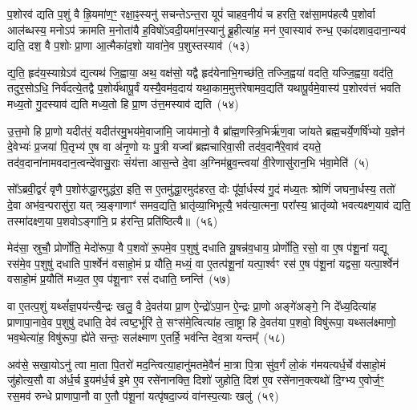 प॒शोरव॑ द्यति प॒शुं वै ह्रि॒यमा॑ण॒ꣳ॒ रक्षा॒ꣴ॒स्यनु॑ सचन्ते\-ऽन्त॒रा यूपं॑ चाहव॒नीयं॑ च हरति॒ रक्ष॑सा॒मप॑हत्यै प॒शोर्वा आल॑ब्धस्य॒ मनो\-ऽप॑ क्रामति म॒नोता॑यै ह॒विषो॑\-ऽवदी॒यमा॑न॒स्यानु॑ ब्रू॒हीत्या॑ह॒ मन॑ ए॒वास्याव॑ रुन्ध॒ एका॑\-दशाव॒दाना॒न्यव॑ द्यति॒ दश॒ वै प॒शोः प्रा॒णा आ॒त्मैका॑द॒शो यावा॑ने॒व प॒शुस्तस्याव॑~(५३)

द्य॒ति॒ हृद॑य॒स्याग्रे\-ऽव॑ द्य॒त्यथ॑ जि॒ह्वाया॒ अथ॒ वक्ष॑सो॒ यद्वै हृद॑येनाभि॒गच्छ॑ति॒ तज्जि॒ह्वया॑ वदति॒ यज्जि॒ह्वया॒ वद॑ति॒ तदुर॒सो\-ऽधि॒ निर्व॑दत्ये॒तद्वै प॒शोर्य॑थापू॒र्वं यस्यै॒वम॑व॒दाय॑ यथा॒काम॒मुत्त॑रेषामव॒द्यति॑ यथापू॒र्वमे॒वास्य॑ प॒शोरव॑त्तं भवति मध्य॒तो गु॒दस्याव॑ द्यति मध्य॒तो हि प्रा॒ण उ॑त्त॒मस्याव॑ द्यति~(५४)

उ॒त्त॒मो हि प्रा॒णो यदीत॑रं॒ यदीत॑रमु॒भय॑मे॒वाजा॑मि॒ जाय॑मानो॒ वै ब्रा᳚ह्म॒णस्त्रि॒भिर्\mbox{}ऋ॑ण॒वा जा॑यते ब्रह्म॒चर्ये॒णर्\mbox{}षि॑भ्यो य॒ज्ञेन॑ दे॒वेभ्यः॑ प्र॒जया॑ पि॒तृभ्य॑ ए॒ष वा अ॑नृ॒णो यः पु॒त्री यज्वा᳚ ब्रह्मचारिवा॒सी तद॑व॒दानै॑रे॒वाव॑ दयते॒ तद॑व॒दाना॑नामवदान॒त्वन्दे॑वासु॒राः संय॑त्ता आस॒न्ते दे॒वा अ॒ग्निम॑ब्रुव॒न्त्वया॑ वी॒रेणासु॑रान॒भि भ॑वा॒मेति॑~(५)

सो᳚\-ऽब्रवी॒द्वरं॑ वृणै प॒शोरु॑द्धा॒रमुद्ध॑रा॒ इति॒ स ए॒तमु॑द्धा॒रमुद॑हरत॒ दोः पू᳚र्वा॒र्धस्य॑ गु॒दं म॑ध्य॒तः श्रोणिं॑ जघना॒र्धस्य॒ ततो॑ दे॒वा अभ॑व॒न्परासु॑रा॒ यत् त्र्य॒ङ्गाणाꣳ॑ समव॒द्यति॒ भ्रातृ॑व्या॒भिभूत्यै॒ भव॑त्या॒त्मना॒ परा᳚स्य॒ भ्रातृ॑व्यो भवत्यक्ष्ण॒याव॑ द्यति॒ तस्मा॑दक्ष्ण॒या प॒शवो\-ऽङ्गा॑नि॒ प्र ह॑रन्ति॒ प्रति॑ष्ठित्यै॥~(५६)

{\anuvakamend[{ए॒तौ प॑शू॒नाꣳ समे॑धस्यै॒व तस्यावो᳚त्त॒मस्याव॑ द्य॒तीति॒ पञ्च॑चत्वारिꣳशच्च}]}%

मेद॑सा॒ स्रुचौ॒ प्रोर्णो॑ति॒ मेदो॑रूपा॒ वै प॒शवो॑ रू॒पमे॒व प॒शुषु॑ दधाति यू॒षन्न॑व॒धाय॒ प्रोर्णो॑ति॒ रसो॒ वा ए॒ष प॑शू॒नां यद्यू रस॑मे॒व प॒शुषु॑ दधाति पा॒र्श्वेन॑ वसाहो॒मं प्र यौ॑ति॒ मध्यं॒ वा ए॒तत्प॑शू॒नां यत्पा॒र्श्वꣳ रस॑ ए॒ष प॑शू॒नां यद्वसा॒ यत्पा॒र्श्वेन॑ वसाहो॒मं प्र॒यौति॑ मध्य॒त ए॒व प॑शू॒नाꣳ रसं॑ दधाति॒ घ्नन्ति॑~(५७)

वा ए॒तत्प॒शुं यथ्सं᳚ज्ञ॒पय॑न्त्यै॒न्द्रः खलु॒ वै दे॒वत॑या प्रा॒ण ऐ॒न्द्रो॑\-ऽपा॒न ऐ॒न्द्रः प्रा॒णो अङ्गे॑अङ्गे॒ नि दे᳚ध्य॒दित्या॑ह प्राणापा॒नावे॒व प॒शुषु॑ दधाति॒ देव॑ त्वष्ट॒र्भूरि॑ ते॒ सꣳस॑मे॒त्वित्या॑ह त्वा॒ष्ट्रा हि दे॒वत॑या प॒शवो॒ विषु॑रूपा॒ यथ्सल॑क्ष्माणो॒ भव॒थेत्या॑ह॒ विषु॑रूपा॒ ह्ये॑ते सन्तः॒ सल॑क्ष्माण ए॒तर्\mbox{}हि॒ भव॑न्ति देव॒त्रा यन्तम्᳚~(५८)

अव॑से॒ सखा॒यो\-ऽनु॑ त्वा मा॒ता पि॒तरो॑ मद॒न्त्वित्या॒हानु॑मतमे॒वैनं॑ मा॒त्रा पि॒त्रा सु॑व॒र्गं लो॒कं ग॑मयत्यर्ध॒र्चे व॑साहो॒मं जु॑होत्य॒सौ वा अ॑र्ध॒र्च इ॒यम॑र्ध॒र्च इ॒मे ए॒व रसे॑नानक्ति॒ दिशो॑ जुहोति॒ दिश॑ ए॒व रसे॑नान॒क्त्यथो॑ दि॒ग्भ्य ए॒वोर्ज॒ꣳ॒ रस॒मव॑ रुन्धे प्राणापा॒नौ वा ए॒तौ प॑शू॒नां यत्पृ॑षदा॒ज्यं वा॑नस्प॒त्याः खलु॑~(५९)

